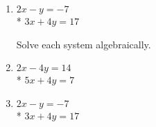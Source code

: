 \begin{enumerate}
\item
$2x-y=-7$\\*
$3x+4y=17$  \vspace{6cm}
  
Solve each system algebraically.
\item
$2x-4y=14$\\*
$5x+4y=7$ \vspace{6cm}

\item
$2x-y=-7$\\*
$3x+4y=17$  \vspace{6cm}


\end{enumerate}
